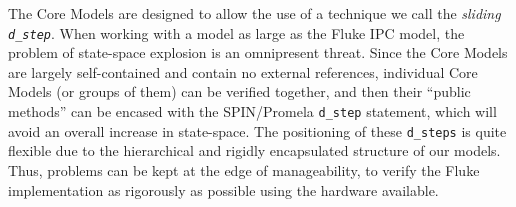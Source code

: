 The Core Models are designed to allow the use of a
technique we call the {\it sliding {\tt d_step}}.  When working with
a model as large as the Fluke IPC model, the problem of state-space
explosion is an omnipresent threat.  Since the Core Models are largely
self-contained and contain no external references, individual Core
Models (or groups of them) can be verified together, and then 
their ``public methods'' can be encased with the SPIN/Promela 
{\tt d_step} statement, which will avoid an overall increase in 
state-space. 
The positioning of these {\tt d_steps} is quite flexible due to the
hierarchical and rigidly encapsulated structure of our models.  Thus,
problems can be kept at the edge of manageability, to verify the Fluke
implementation as rigorously as possible using the hardware available.












